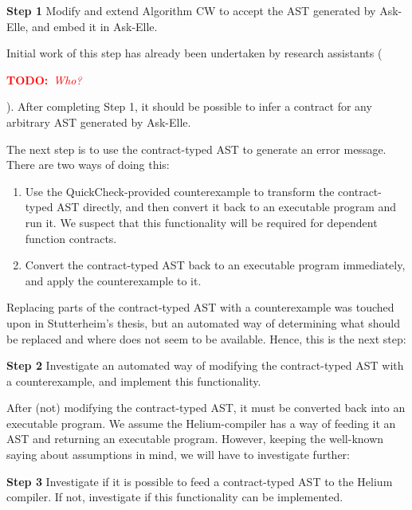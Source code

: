 \documentclass[10pt,a4paper]{article}
\newcommand{\annotate}[3]{
	\begin{scriptsize}
	\textcolor{#1}{\textbf{#2}~\textit{#3}}
	\end{scriptsize}\newline}
\newcommand{\todo}[1]{\annotate{red} {TODO:} {#1}}
\begin{document}
\begin{description}
	\item{\textbf{Step 1}} Modify and extend Algorithm CW to accept the AST generated by Ask-Elle, and embed it in Ask-Elle.
\end{description}

Initial work of this step has already been undertaken by research assistants (\todo{Who?}).
After completing Step 1, it should be possible to infer a contract for any arbitrary AST generated by Ask-Elle.

The next step is to use the contract-typed AST to generate an error message.
There are two ways of doing this:

\begin{enumerate}
	\item Use the QuickCheck-provided counterexample to transform the contract-typed AST directly, and then convert it back to an executable program and run it. We suspect that this functionality will be required for dependent function contracts.
	\item Convert the contract-typed AST back to an executable program immediately, and apply the counterexample to it.
\end{enumerate}

Replacing parts of the contract-typed AST with a counterexample was touched upon in Stutterheim's thesis, but an automated way of determining what should be replaced and where does not seem to be available.
Hence, this  is the next step:
\begin{description}
	\item{\textbf{Step 2}} Investigate an automated way of modifying the contract-typed AST with a counterexample, and implement this functionality.
\end{description}

After (not) modifying the contract-typed AST, it must be converted back into an executable program.
We assume the Helium-compiler has a way of feeding it an AST and returning an executable program.
However, keeping the well-known saying about assumptions in mind, we will have to investigate further:

\begin{description}
	\item{\textbf{Step 3}} Investigate if it is possible to feed a contract-typed AST to the Helium compiler. If not, investigate if this functionality can be implemented.
\end{description}
\end{document}
